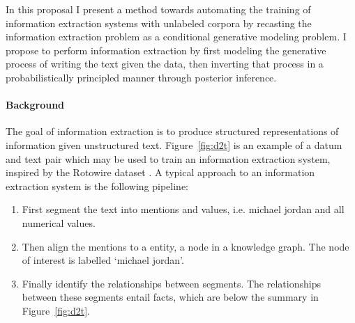 \documentclass[12pt]{article}
\begin{document}
In this proposal I present a method towards automating the
training of information extraction systems with unlabeled corpora
by recasting the information extraction problem as a conditional generative modeling problem.
I propose to perform information extraction by first modeling the 
generative process of writing the text given the data,
then inverting that process in a probabilistically principled manner
through posterior inference.

\paragraph{Background}
The goal of information extraction is to produce structured representations of information
given unstructured text.
Figure~\ref{fig:d2t} is an example of a datum and text pair which may be used to
train an information extraction system, inspired by the Rotowire dataset \citep{wiseman2017d2t}.
A typical approach to an information extraction system is the following pipeline:
\begin{enumerate}
\item First segment the text into mentions and values, i.e. michael jordan and all numerical values.
\item Then align the mentions to a entity, a node in a knowledge graph.
The node of interest is labelled `michael jordan'.
\item Finally identify the relationships between segments.
The relationships between these segments entail facts, which
are below the summary in Figure~\ref{fig:d2t}.
\end{enumerate}
\end{document}
